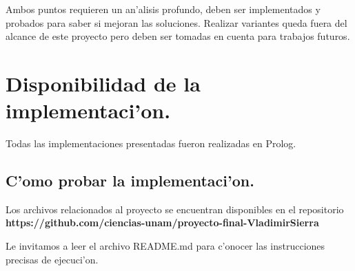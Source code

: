\documentclass[12pt]{article}
\begin{document}
    Ambos puntos requieren un an'alisis profundo, deben ser implementados y probados
    para saber si mejoran las soluciones.
    Realizar variantes queda fuera del alcance de este proyecto pero
    deben ser tomadas en cuenta para trabajos futuros.


    \section{Disponibilidad de la implementaci'on.}

    Todas las implementaciones presentadas fueron realizadas en Prolog.

    \subsection{C'omo probar la implementaci'on.}

    Los archivos relacionados al proyecto se encuentran disponibles
    en el repositorio\\
    \textbf{
    https://github.com/ciencias-unam/proyecto-final-VladimirSierra
    }

    Le invitamos a leer el archivo README.md para
    c'onocer las instrucciones precisas de ejecuci'on.


    \printbibliography
\end{document}
